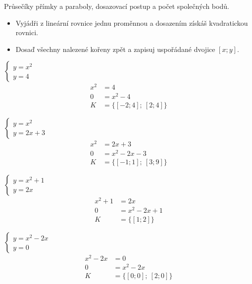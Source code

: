 \documentclass[11pt,a4paper]{article}
\begin{document}
Průsečíky přímky a paraboly, dosazovací postup a počet společných bodů.
\begin{itemize}
\item Vyjádři z lineární rovnice jednu proměnnou a dosazením získáš kvadratickou rovnici.
\item Dosaď všechny nalezené kořeny zpět a zapisuj uspořádané dvojice $[x;y]$.
\end{itemize}
\begin{prikladReseniBox}[title={Příklad 1}]
$\begin{cases}y=x^{2}\\y=4\end{cases}$
\tcblower
\[
\begin{aligned}
x^{2}&=4\\[2pt]
0&=x^{2} - 4\\[2pt]
K&=\{[-2;4];\ [2;4]\}
\end{aligned}
\]
\end{prikladReseniBox}
\begin{prikladReseniBox}[title={Příklad 2}]
$\begin{cases}y=x^{2}\\y=2x + 3\end{cases}$
\tcblower
\[
\begin{aligned}
x^{2}&=2x + 3\\[2pt]
0&=x^{2} - 2x - 3\\[2pt]
K&=\{[-1;1];\ [3;9]\}
\end{aligned}
\]
\end{prikladReseniBox}
\begin{prikladReseniBox}[title={Příklad 3}]
$\begin{cases}y=x^{2} + 1\\y=2x\end{cases}$
\tcblower
\[
\begin{aligned}
x^{2} + 1&=2x\\[2pt]
0&=x^{2} - 2x + 1\\[2pt]
K&=\{[1;2]\}
\end{aligned}
\]
\end{prikladReseniBox}
\begin{zadaniReseniBox}[title={Samostatná práce 1}]
$\begin{cases}y=x^{2} - 2x\\y=0\end{cases}$
\tcblower
\[
\begin{aligned}
x^{2} - 2x&=0\\[2pt]
0&=x^{2} - 2x\\[2pt]
K&=\{[0;0];\ [2;0]\}
\end{aligned}
\]
\end{zadaniReseniBox}
\end{document}
